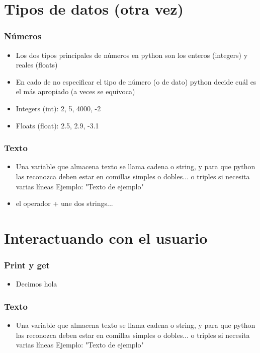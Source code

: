 \documentclass[hyperref={pdfpagelabels=false},xcolor=pst,pdf,fragile]{beamer}
\begin{document}
\section{Tipos de datos (otra vez)}
\begin{frame}
    \frametitle{Números}
    \pause
    \begin{itemize}
    \item Los dos tipos principales de números en python son los enteros (integers) y reales (floats)
    \item En cado de no especificar el tipo de número (o de dato) python decide cuál es el más apropiado (a veces se equivoca)
    \item Integers (int): 2, 5, 4000, -2
    \item Floats (float): 2.5, 2.9, -3.1
    \end{itemize}
\end{frame}

\begin{frame}
    \frametitle{Texto}
    \pause
    \begin{itemize}
    \item Una variable que almacena texto se llama cadena o string, y para que python las reconozca deben estar en comillas simples o dobles... o triples si necesita varias líneas
    Ejemplo: "Texto de ejemplo"
    \item el operador + une dos strings...
    \end{itemize}
\end{frame}

\section{Interactuando con el usuario}
\begin{frame}
    \frametitle{Print y get}
    \pause
    \begin{itemize}
    \item Decimos hola
    \end{itemize}
\end{frame}

\begin{frame}
    \frametitle{Texto}
    \pause
    \begin{itemize}
    \item Una variable que almacena texto se llama cadena o string, y para que python las reconozca deben estar en comillas simples o dobles... o triples si necesita varias líneas
    Ejemplo: "Texto de ejemplo"
    \end{itemize}
\end{frame}
\end{document}
